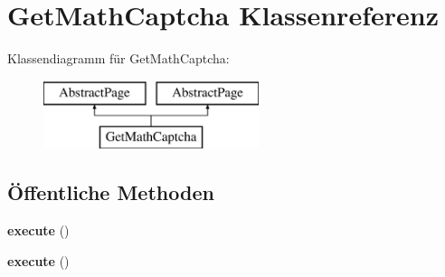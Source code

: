 \hypertarget{class_get_math_captcha}{}\section{Get\+Math\+Captcha Klassenreferenz}
\label{class_get_math_captcha}
Klassendiagramm für Get\+Math\+Captcha\+:\begin{figure}[H]
\begin{center}
\leavevmode
\includegraphics[height=2.000000cm]{class_get_math_captcha}
\end{center}
\end{figure}
\subsection*{Öffentliche Methoden}
\begin{DoxyCompactItemize}
\item 
\mbox{\label{class_get_math_captcha_a987d62f54f3910c72b9665fd3753ea23}} 
{\bfseries execute} ()
\item 
\mbox{\label{class_get_math_captcha_a987d62f54f3910c72b9665fd3753ea23}} 
{\bfseries execute} ()
\end{DoxyCompactItemize}
